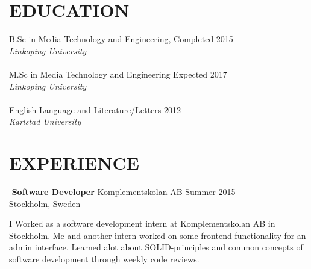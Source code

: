 \documentclass{res}
\begin{document}
 


\address{\bf  PRESENT ADDRESS\\Tunnbindaregatan 21\\602 21 Norrkoping, Sweden\\
+46 727 273125}
\address{\bf ADDITIONAL INFORMATION \\ Github: CarlEnglund \\ Mail: mail@carlenglund.se
\\ Website: www.carlenglund.se}

                                  
\begin{resume}
          
\section{EDUCATION}                
    B.Sc in Media Technology and Engineering, Completed 2015   \\
    \emph{Linkoping University} \\      
    \\ M.Sc in Media Technology and Engineering Expected 2017\\\emph{Linkoping University} \\  
    \\ English Language and Literature/Letters 2012\\\emph{Karlstad University} \\          
       

 
\section{EXPERIENCE}
   \vspace{-0.1in}

   \begin{tabbing}
   \hspace{2.3in}\= \hspace{2.6in}\= \kill %
    {\bf Software Developer} \>Komplementskolan AB     \>Summer 2015\\
                             \>Stockholm, Sweden
   \end{tabbing}\vspace{-20pt}      %
    I Worked as a software development intern at Komplementskolan AB in Stockholm. Me and another intern worked on some frontend functionality for an admin interface. Learned alot about SOLID-principles and common concepts of software development through weekly code reviews.


\end{resume}
\end{document}
